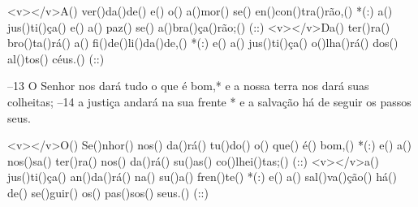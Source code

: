 <v></v>A() ver()da()de() e() o() a()mor() se() en()con()tra()rão,() *(:)
a() jus()ti()ça() e() a() paz() se() a()bra()ça()rão;() (::)
<v></v>Da() ter()ra() bro()ta()rá() a() fi()de()li()da()de,() *(:)
e() a() jus()ti()ça() o()lha()rá() dos() al()tos() céus.() (::)

–13 O Senhor nos dará tudo o que é bom,* 
e a nossa terra nos dará suas colheitas; 
–14 a justiça andará na sua frente * 
e a salvação há de seguir os passos seus. 

<v></v>O() Se()nhor() nos() da()rá() tu()do() o() que() é() bom,() *(:)
e() a() nos()sa() ter()ra() nos() da()rá() su()as() co()lhei()tas;() (::)
<v></v>a() jus()ti()ça() an()da()rá() na() su()a() fren()te() *(:)
e() a() sal()va()ção() há() de() se()guir() os() pas()sos() seus.() (::)